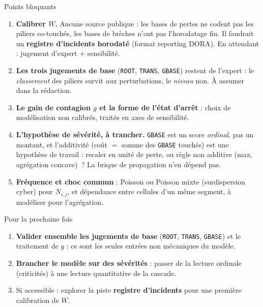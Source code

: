 \documentclass[11pt]{beamer}
\begin{document}
\begin{frame}{Points bloquants}
\small
\begin{enumerate}
\item \textbf{Calibrer $W$.} Aucune source publique : les bases de pertes ne codent pas
      les piliers co-touchés, les bases de brèches n'ont pas l'horodatage fin. Il
      faudrait un \textbf{registre d'incidents horodaté} (format reporting DORA).
      En attendant : jugement d'expert $+$ sensibilité.
\item \textbf{Les trois jugements de base} (\texttt{ROOT}, \texttt{TRANS},
      \texttt{GBASE}) restent de l'expert : le \emph{classement} des piliers survit aux
      perturbations, le \emph{niveau} non. À assumer dans la rédaction.
\item \textbf{Le gain de contagion $g$ et la forme de l'état d'arrêt} : choix de
      modélisation non calibrés, traités en axes de sensibilité.
\item \textbf{L'hypothèse de sévérité, à trancher.} \texttt{GBASE} est un score
      \emph{ordinal}, pas un montant, et l'additivité (coût $=$ somme des \texttt{GBASE}
      touchés) est une hypothèse de travail : recaler en unité de perte, ou règle non
      additive (max, agrégation concave)~? La brique de propagation n'en dépend pas.
\item \textbf{Fréquence et choc commun} : Poisson ou Poisson mixte (surdispersion
      cyber) pour $N_{i,j}$, et dépendance entre cellules d'un même segment, à
      modéliser pour l'agrégation.
\end{enumerate}
\end{frame}

\begin{frame}{Pour la prochaine fois}
\begin{enumerate}
\item \textbf{Valider ensemble les jugements de base} (\texttt{ROOT}, \texttt{TRANS},
      \texttt{GBASE}) et le traitement de $g$ : ce sont les seules entrées non
      mécaniques du modèle.
\item \textbf{Brancher le modèle sur des sévérités} : passer de la lecture ordinale
      (criticités) à une lecture quantitative de la cascade.
\item Si accessible : explorer la piste \textbf{registre d'incidents} pour une première
      calibration de $W$.
\end{enumerate}
\end{frame}
\end{document}
